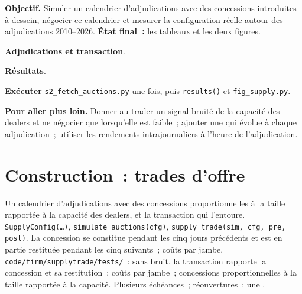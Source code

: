 \begin{tutorial}
\textbf{Objectif.} Simuler un calendrier d'adjudications avec des concessions introduites à dessein, négocier ce calendrier et mesurer la configuration réelle autour des adjudications 2010--2026.
\textbf{État final~:} les tableaux et les deux figures.
\begin{tutsteps}
\item \textbf{Adjudications et transaction}.
\label{lst:s2:supply-trades:model}
\item \textbf{Résultats}.
\label{lst:s2:supply-trades:results}
\item \textbf{Exécuter} \texttt{s2\_fetch\_auctions.py} une fois, puis \texttt{results()} et \texttt{fig\_supply.py}.
\end{tutsteps}
\textbf{Pour aller plus loin.} Donner au trader un signal bruité de la capacité des dealers et ne négocier que lorsqu'elle est faible~; ajouter une  qui évolue à
chaque adjudication~; utiliser les rendements intrajournaliers à l'heure de l'adjudication.
\end{tutorial}

\section{Construction~: trades d'offre}\label{bld:s2:supply-trades:supplytrade}

\begin{build}
 Un calendrier d'adjudications avec des concessions proportionnelles à la taille rapportée à la capacité des dealers, et la transaction qui l'entoure.
 \texttt{SupplyConfig(\dots)}, \texttt{simulate\_auctions(cfg)}, \texttt{supply\_trade(sim, cfg, pre, post)}.
 La concession se constitue pendant les cinq jours précédents et est en partie restituée pendant les cinq suivants~; coûts par jambe.
 \texttt{code/firm/supplytrade/tests/}~: sans bruit, la transaction rapporte la concession et sa restitution~; coûts par jambe~;
concessions proportionnelles à la taille rapportée à la capacité.
 Plusieurs échéances~; réouvertures~; une .
\end{build}

